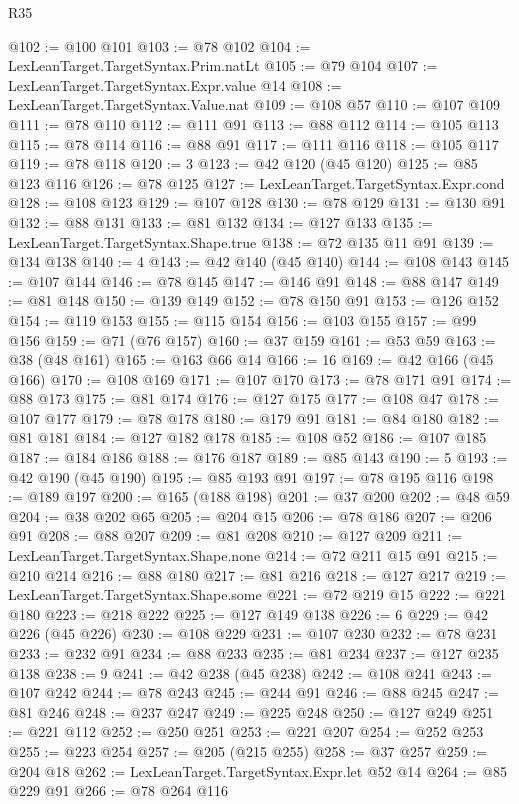 \begin{lexlean}{R35}
\begin{coremodule}
@102 := @100 @101
@103 := @78 @102
@104 := LexLeanTarget.TargetSyntax.Prim.natLt
@105 := @79 @104
@107 := LexLeanTarget.TargetSyntax.Expr.value @14
@108 := LexLeanTarget.TargetSyntax.Value.nat
@109 := @108 @57
@110 := @107 @109
@111 := @78 @110
@112 := @111 @91
@113 := @88 @112
@114 := @105 @113
@115 := @78 @114
@116 := @88 @91
@117 := @111 @116
@118 := @105 @117
@119 := @78 @118
@120 := 3
@123 := @42 @120 (@45 @120)
@125 := @85 @123 @116
@126 := @78 @125
@127 := LexLeanTarget.TargetSyntax.Expr.cond
@128 := @108 @123
@129 := @107 @128
@130 := @78 @129
@131 := @130 @91
@132 := @88 @131
@133 := @81 @132
@134 := @127 @133
@135 := LexLeanTarget.TargetSyntax.Shape.true
@138 := @72 @135 @11 @91
@139 := @134 @138
@140 := 4
@143 := @42 @140 (@45 @140)
@144 := @108 @143
@145 := @107 @144
@146 := @78 @145
@147 := @146 @91
@148 := @88 @147
@149 := @81 @148
@150 := @139 @149
@152 := @78 @150 @91
@153 := @126 @152
@154 := @119 @153
@155 := @115 @154
@156 := @103 @155
@157 := @99 @156
@159 := @71 (@76 @157)
@160 := @37 @159
@161 := @53 @59
@163 := @38 (@48 @161)
@165 := @163 @66 @14
@166 := 16
@169 := @42 @166 (@45 @166)
@170 := @108 @169
@171 := @107 @170
@173 := @78 @171 @91
@174 := @88 @173
@175 := @81 @174
@176 := @127 @175
@177 := @108 @47
@178 := @107 @177
@179 := @78 @178
@180 := @179 @91
@181 := @84 @180
@182 := @81 @181
@184 := @127 @182 @178
@185 := @108 @52
@186 := @107 @185
@187 := @184 @186
@188 := @176 @187
@189 := @85 @143
@190 := 5
@193 := @42 @190 (@45 @190)
@195 := @85 @193 @91
@197 := @78 @195 @116
@198 := @189 @197
@200 := @165 (@188 @198)
@201 := @37 @200
@202 := @48 @59
@204 := @38 @202 @65
@205 := @204 @15
@206 := @78 @186
@207 := @206 @91
@208 := @88 @207
@209 := @81 @208
@210 := @127 @209
@211 := LexLeanTarget.TargetSyntax.Shape.none
@214 := @72 @211 @15 @91
@215 := @210 @214
@216 := @88 @180
@217 := @81 @216
@218 := @127 @217
@219 := LexLeanTarget.TargetSyntax.Shape.some
@221 := @72 @219 @15
@222 := @221 @180
@223 := @218 @222
@225 := @127 @149 @138
@226 := 6
@229 := @42 @226 (@45 @226)
@230 := @108 @229
@231 := @107 @230
@232 := @78 @231
@233 := @232 @91
@234 := @88 @233
@235 := @81 @234
@237 := @127 @235 @138
@238 := 9
@241 := @42 @238 (@45 @238)
@242 := @108 @241
@243 := @107 @242
@244 := @78 @243
@245 := @244 @91
@246 := @88 @245
@247 := @81 @246
@248 := @237 @247
@249 := @225 @248
@250 := @127 @249
@251 := @221 @112
@252 := @250 @251
@253 := @221 @207
@254 := @252 @253
@255 := @223 @254
@257 := @205 (@215 @255)
@258 := @37 @257
@259 := @204 @18
@262 := LexLeanTarget.TargetSyntax.Expr.let @52 @14
@264 := @85 @229 @91
@266 := @78 @264 @116

\end{coremodule}
\end{lexlean}
